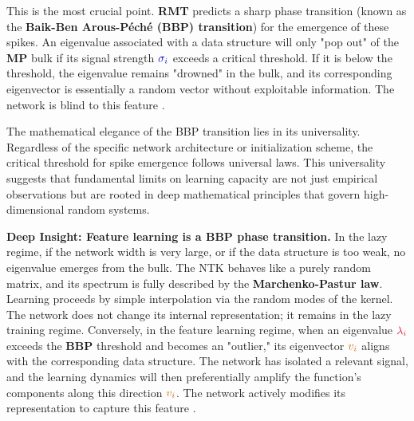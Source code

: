 \documentclass[a4paper]{article}
\theoremstyle{plain}
\theoremstyle{definition}
\theoremstyle{remark}
\begin{document}
\begin{tcolorbox}[colback=blue!10,colframe=blue!60!black,title={\textbf{🎯 THEOREM: BBP Phase Transition}},enhanced,drop shadow]
This is the most crucial point. \textcolor{purple!80!black}{\textbf{RMT}} predicts a sharp phase transition (known as the \textcolor{orange!80!black}{\textbf{Baik-Ben Arous-Péché (BBP) transition}}) for the emergence of these spikes. An eigenvalue associated with a data structure will only "pop out" of the \textcolor{orange!80!black}{\textbf{MP}} bulk if its signal strength $\textcolor{blue!80!black}{\sigma_i}$ exceeds a critical threshold. If it is below the threshold, the eigenvalue remains "drowned" in the bulk, and its corresponding eigenvector is essentially a random vector without exploitable information. The network is blind to this feature \cite{townsend2022sobolev}.
\end{tcolorbox}

The mathematical elegance of the BBP transition lies in its universality. Regardless of the specific network architecture or initialization scheme, the critical threshold for spike emergence follows universal laws. This universality suggests that fundamental limits on learning capacity are not just empirical observations but are rooted in deep mathematical principles that govern high-dimensional random systems.

\begin{tcolorbox}[colback=red!15,colframe=red!70!black,title={\textbf{🔥 REVOLUTIONARY INSIGHT: Feature Learning = BBP Transition}},enhanced,drop shadow]
\textbf{Deep Insight: Feature learning is a \textcolor{orange!80!black}{\textbf{BBP}} phase transition.} In the lazy regime, if the network width is very large, or if the data structure is too weak, no eigenvalue emerges from the bulk. The \textcolor{kernelcolor}{NTK} behaves like a purely random matrix, and its spectrum is fully described by the \textcolor{orange!80!black}{\textbf{Marchenko-Pastur law}}. Learning proceeds by simple interpolation via the random modes of the kernel. The network does not change its internal representation; it remains in the lazy training regime. Conversely, in the feature learning regime, when an eigenvalue $\textcolor{kernelcolor}{\lambda_i}$ exceeds the \textcolor{orange!80!black}{\textbf{BBP}} threshold and becomes an "outlier," its eigenvector $\textcolor{orange!80!black}{v_i}$ aligns with the corresponding data structure. The network has isolated a relevant signal, and the learning dynamics will then preferentially amplify the function's components along this direction $\textcolor{orange!80!black}{v_i}$. The network actively modifies its representation to capture this feature \cite{bach2017breaking}.
\end{tcolorbox}
\end{document}
